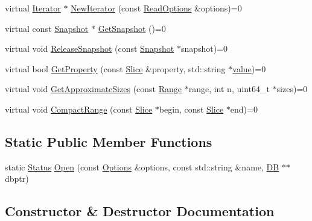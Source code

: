 \begin{DoxyCompactItemize}
virtual \mbox{\hyperlink{classleveldb_1_1_iterator}{Iterator}} $\ast$ \mbox{\hyperlink{classleveldb_1_1_d_b_a5629308235de24c05c286c353d4e7d32}{New\+Iterator}} (const \mbox{\hyperlink{structleveldb_1_1_read_options}{Read\+Options}} \&options)=0
\item 
virtual const \mbox{\hyperlink{classleveldb_1_1_snapshot}{Snapshot}} $\ast$ \mbox{\hyperlink{classleveldb_1_1_d_b_a7d13f6336c7c5f0bf79578d57c45568c}{Get\+Snapshot}} ()=0
\item 
virtual void \mbox{\hyperlink{classleveldb_1_1_d_b_aa46de65e990bd179db0aee770af89144}{Release\+Snapshot}} (const \mbox{\hyperlink{classleveldb_1_1_snapshot}{Snapshot}} $\ast$snapshot)=0
\item 
virtual bool \mbox{\hyperlink{classleveldb_1_1_d_b_afcd557d80bac6668f20372c9e737d807}{Get\+Property}} (const \mbox{\hyperlink{classleveldb_1_1_slice}{Slice}} \&property, std\+::string $\ast$\mbox{\hyperlink{version__set_8cc_a38c8b88c432e666ad10b0c5573e1160a}{value}})=0
\item 
virtual void \mbox{\hyperlink{classleveldb_1_1_d_b_ad4d54aa1dbcecc8583b013ab2d67aeff}{Get\+Approximate\+Sizes}} (const \mbox{\hyperlink{structleveldb_1_1_range}{Range}} $\ast$range, int n, uint64\+\_\+t $\ast$sizes)=0
\item 
virtual void \mbox{\hyperlink{classleveldb_1_1_d_b_aeea500cbc6704454b3be6908d5da8b3a}{Compact\+Range}} (const \mbox{\hyperlink{classleveldb_1_1_slice}{Slice}} $\ast$begin, const \mbox{\hyperlink{classleveldb_1_1_slice}{Slice}} $\ast$end)=0
\end{DoxyCompactItemize}
\subsection*{Static Public Member Functions}
\begin{DoxyCompactItemize}
\item 
static \mbox{\hyperlink{classleveldb_1_1_status}{Status}} \mbox{\hyperlink{classleveldb_1_1_d_b_ac1da2b48e911287d86f3a3bfa0f851fe}{Open}} (const \mbox{\hyperlink{structleveldb_1_1_options}{Options}} \&options, const std\+::string \&name, \mbox{\hyperlink{classleveldb_1_1_d_b}{DB}} $\ast$$\ast$dbptr)
\end{DoxyCompactItemize}


\subsection{Constructor \& Destructor Documentation}
\mbox{\label{classleveldb_1_1_d_b_ac673450f7af2426a7987efbd2b50b890}} 
